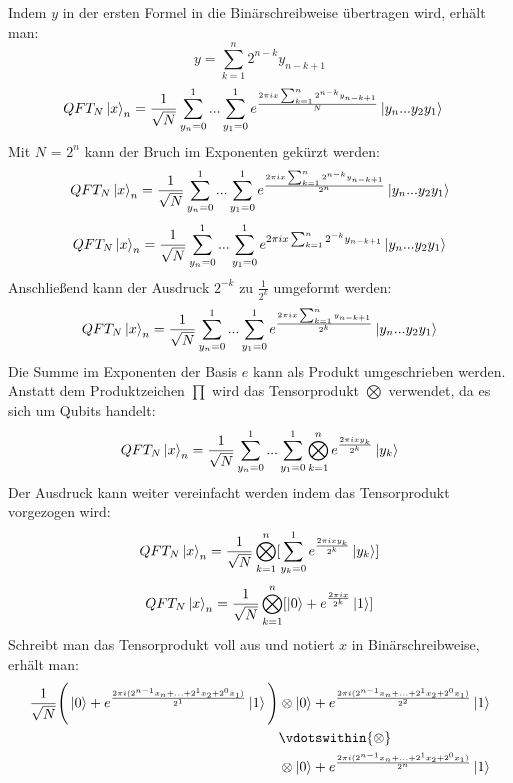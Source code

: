 Indem \(y\) in der ersten Formel in die Binärschreibweise übertragen wird, erhält man:
% 
%
%
\[ y = \sum_{k=1}^{n}2^{n-k} y_{n-k+1}\]  
\begin{align}
  QFT_{N}\ket{x}_{n} &=
    \frac{1}{\sqrt{N}}
    \sum_{y_n=0}^{1} ...
    \sum_{y_1=0}^{1} e^{\frac{2 \pi i x \sum_{k=1}^{n}2^{n-k} y_{n-k+1}}{N}}
    \ket{y_n ... y_{2}y_{1}}
\end{align}
Mit \(N\) = \(2^n\) kann der Bruch im Exponenten gekürzt werden:
\[QFT_{N}\ket{x}_{n} = \frac{1}{\sqrt{N}}\sum_{y_n=0}^{1}...\sum_{y_1=0}^{1}  e^{\frac{2 \pi i x \sum_{k=1}^{n}2^{n-k} y_{n-k+1}}{2^n}}\ket{y_n ... y_{2}y_{1}}\]
\[QFT_{N}\ket{x}_{n} = \frac{1}{\sqrt{N}}\sum_{y_n=0}^{1}...\sum_{y_1=0}^{1}  e^{2 \pi i x \sum_{k=1}^{n}2^{-k} y_{n-k+1}}\ket{y_n ... y_{2}y_{1}}\]
Anschließend kann der Ausdruck \(2^{-k}\) zu \(\frac{1}{2^k}\) umgeformt werden: 
\[QFT_{N}\ket{x}_{n} = \frac{1}{\sqrt{N}}\sum_{y_n=0}^{1}...\sum_{y_1=0}^{1}  e^{\frac{2 \pi i x \sum_{k=1}^{n} y_{n-k+1}}{2^k}}\ket{y_n ... y_{2}y_{1}}\]
Die Summe im Exponenten der Basis \(e\) kann als Produkt umgeschrieben werden.
Anstatt dem Produktzeichen \(\prod\) wird das Tensorprodukt \(\bigotimes\) verwendet, da es sich um Qubits handelt:
\[QFT_{N}\ket{x}_{n} = \frac{1}{\sqrt{N}}\sum_{y_n=0}^{1}...\sum_{y_1=0}^{1} \bigotimes_{k=1}^n{ e^{\frac{2 \pi i x y_k}{2^k}}}\ket{y_{k}}\]
Der Ausdruck kann weiter vereinfacht werden indem das Tensorprodukt vorgezogen wird:
\[QFT_{N}\ket{x}_{n} = \frac{1}{\sqrt{N}}\bigotimes_{k=1}^n [  \sum_{y_k=0}^{1}{ e^{\frac{2 \pi i x y_k}{2^k}}}\ket{y_{k}}]\]
\[QFT_{N}\ket{x}_{n} = \frac{1}{\sqrt{N}}\bigotimes_{k=1}^n [  \ket{0} + { e^{\frac{2 \pi i x}{2^k}}}\ket{1}]\] 
Schreibt man das Tensorprodukt voll aus und notiert \(x\) in Binärschreibweise, erhält man:
\begin{align*}
\frac{1}{\sqrt{N}}\Bigg(
  \ket{0} + { e^{\frac{2 \pi i (2^{n-1}x_n+...+2^1x_2+2^0x_1)}{2^1}}}\ket{1}
  \Bigg)
  &\otimes
  \ket{0} + { e^{\frac{2 \pi i (2^{n-1}x_n+...+2^1x_2+2^0x_1)}{2^2}}}\ket{1} \\
  &\vdotswithin{\otimes} \\
  &\otimes
  \ket{0} + { e^{\frac{2 \pi i (2^{n-1}x_n+...+2^1x_2+2^0x_1)}{2^n}}}\ket{1}
\end{align*}

